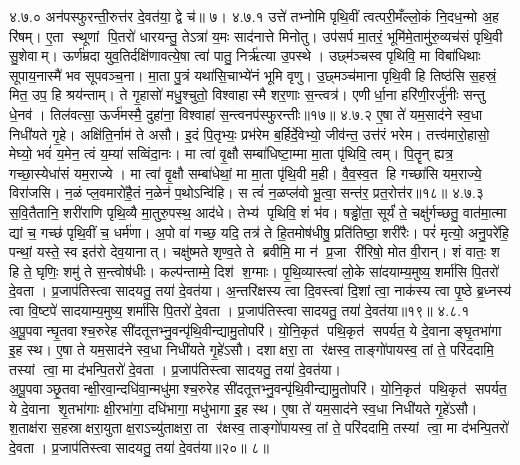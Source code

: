 ४.७.०
अन॑पस्फुरन्ती॒रुत्त॑र दे॒वत॑या॒ द्वे च॑॥ ७।
४.७.१
उत्ते॑ तभ्नोमि पृथि॒वीं त्वत्परी॒मँल्लो॒कं नि॒दध॒न्मो अ॒ह रि॑षम्। ए॒ता स्थूणां पि॒तरो॑ धारयन्तु॒ तेऽत्रा॑ य॒मः साद॑नात्ते मिनोतु। उप॑सर्प मा॒तरं॒ भूमि॑मे॒तामु॑रु॒व्यच॑सं पृथि॒वी सु॒शेवाम्। ऊर्ण॑म्रदा युव॒तिर्दक्षि॑णावत्ये॒षा त्वा॑ पातु॒ निर्\mbox{}ऋ॑त्या उ॒पस्थे। उछ्म॑ञ्चस्व पृथिवि॒ मा विबा॑धिथाः सूपाय॒नास्मै॑ भव सूपवञ्च॒ना। मा॒ता पु॒त्रं यथा॑सि॒चाभ्ये॑नं भूमि वृणु। उ॒छ्मञ्च॑माना पृथि॒वी हि तिष्ठ॑सि स॒हस्रं॒ मित॒ उप॒ हि श्रय॑न्ताम्। ते गृ॒हासो॑ मधु॒श्चुतो॒ विश्वाहास्मै शर॒णाः स॒न्त्वत्र॑। एणीर्धा॒ना हरि॑णी॒रर्जु॑नीः सन्तु धे॒नव॑। तिल॑वत्सा॒ ऊर्ज॑मस्मै॒ दुहा॑ना॒ विश्वाहा॑ स॒न्त्वनप॑स्फुरन्तीः॥१७॥
४.७.२
ए॒षा ते॑ यम॒साद॑ने स्व॒धा निधी॑यते गृ॒हे। अक्षि॑ति॒र्नाम॑ ते असौ। इ॒दं पि॒तृभ्यः॒ प्रभ॑रेम ब॒र्\mbox{}हिर्दे॒वेभ्यो॒ जीव॑न्त॒ उत्त॑रं भरेम। तत्त्व॑मारो॒हासो॒ मेघ्यो॒ भवं॑ य॒मेन॒ त्वं य॒म्या॑ सव्विंदा॒नः। मा त्वा॑ वृ॒क्षौ सम्बा॑धिष्टा॒म्मा मा॒ता पृ॑थिवि॒ त्वम्। पि॒तॄन् ह्यत्र॒ गच्छा॒स्येधा॑सं यम॒राज्ये। मा त्वा॑ वृ॒क्षौ सम्बा॑धेथां॒ मा मा॒ता पृ॑थि॒वी म॒ही। वै॒व॒स्व॒त हि गच्छा॑सि यम॒राज्ये॒ विरा॑जसि। न॒ळं प्ल॒वमारो॑है॒तं न॒ळेन॑ प॒थोऽन्वि॑हि। स त्वं॑ न॒ळप्ल॑वो भू॒त्वा॒ सन्त॑र॒ प्रत॒रोत्त॑र॥१८॥
४.७.३
स॒वि॒तैतानि॒ शरी॑राणि पृथि॒व्यै मा॒तुरु॒पस्थ॒ आद॑धे। तेभ्य॑ पृथिवि॒ शं भ॑व। षड्ढो॑ता॒ सूर्यं॑ ते॒ चक्षु॑र्गच्छतु॒ वात॑मा॒त्मा द्यां च॒ गच्छ॑ पृथि॒वीं च॒ धर्म॑णा। अ॒पो वा॑ गच्छ॒ यदि॒ तत्र॑ ते हि॒तमोष॑धीषु॒ प्रति॑तिष्ठा॒ शरी॑रैः। परं॑ मृत्यो॒ अनु॒परे॑हि॒ पन्थां॒ यस्ते॒ स्व इत॑रो देव॒यानात्। चक्षु॑ष्मते शृण्व॒ते ते ब्रवीमि॒ मा न॑ प्र॒जा री॑रिषो॒ मोत वी॒रान्। शं वातः॒ श हि ते॒ घृणिः॒ शमु॑ ते स॒न्त्वोष॑धीः। कल्प॑न्ताम्मे॒ दिश॑ श॒ग्माः। पृ॒थि॒व्यास्त्वा॑ लो॒के सा॑दयाम्य॒मुष्य॒ शर्मा॑सि पि॒तरो॑ दे॒वता। प्र॒जाप॑तिस्त्वा सादयतु॒ तया॑ दे॒वत॑या। अ॒न्तरि॑क्षस्य त्वा दि॒वस्त्वा॑ दि॒शां त्वा॒ नाक॑स्य त्वा पृ॒ष्ठे ब्र॒ध्नस्य॑ त्वा वि॒ष्टपे॑ सादयाम्य॒मुष्य॒ शर्मा॑सि पि॒तरो॑ दे॒वता। प्र॒जाप॑तिस्त्वा सादयतु॒ तया॑ दे॒वत॑या॥१९॥
४.८.१
अ॒पू॒पवान्घृ॒तवाश्च॒रुरेह सी॑दतूत्तभ्नु॒वन्पृ॑थि॒वीन्द्यामु॒तोपरि॑। यो॒नि॒कृत॑ पथि॒कृत॑ सपर्यत॒ ये दे॒वानाङ्घृ॒तभा॑गा इ॒ह स्थ। ए॒षा ते यम॒साद॑ने स्व॒धा निधी॑यते गृ॒हे॑ऽसौ। दशाक्षरा॒ ता र॑क्षस्व॒ ताङ्गो॑पायस्व॒ तां ते॒ परि॑ददामि॒ तस्यां त्वा॒ मा द॑भन्पि॒तरो॑ दे॒वता। प्र॒जाप॑तिस्त्वा सादयतु॒ तया॑ दे॒वत॑या। अ॒पू॒पवाञ्छृ॒तवान्क्षी॒रवा॒न्दधि॑वा॒न्मधु॑माश्च॒रुरेह सी॑दतूत्तभ्नु॒वन्पृ॑थि॒वीन्द्यामु॒तोपरि॑। यो॒नि॒कृत॑ पथि॒कृत॑ सपर्यत॒ ये दे॒वाना शृ॒तभा॑गाः क्षी॒रभा॑गा॒ दधि॑भागा॒ मधु॑भागा इ॒ह स्थ। ए॒षा ते॑ यम॒साद॑ने स्व॒धा निधी॑यते गृ॒हे॑ऽसौ। श॒ताक्ष॑रा स॒हस्राक्षरा॒युताक्ष॒राऽच्यु॑ताक्षरा॒ ता र॑क्षस्व॒ ताङ्गो॑पायस्व॒ तां ते॒ परि॑ददामि॒ तस्यां त्वा॒ मा द॑भन्पि॒तरो॑ दे॒वता। प्र॒जाप॑तिस्त्वा सादयतु॒ तया॑ दे॒वत॑या॥२०॥ ८॥
\anuvakamend

